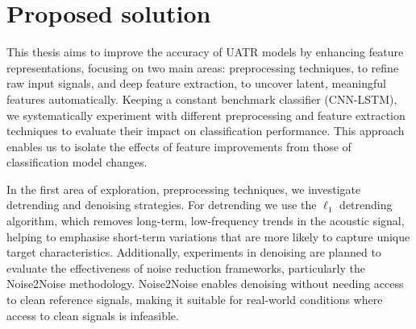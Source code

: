 
\section{Proposed solution}

This thesis aims to improve the accuracy of UATR models by enhancing feature representations, focusing on two main areas: preprocessing techniques, to refine raw input signals, and deep feature extraction, to uncover latent, meaningful features automatically. Keeping a constant benchmark classifier (CNN-LSTM), we systematically experiment with different preprocessing and feature extraction techniques to evaluate their impact on classification performance. This approach enables us to isolate the effects of feature improvements from those of classification model changes.

In the first area of exploration, preprocessing techniques, we investigate detrending and denoising strategies. For detrending we use the $\ell_1$ detrending algorithm, which removes long-term, low-frequency trends in the acoustic signal, helping to emphasise short-term variations that are more likely to capture unique target characteristics. Additionally, experiments in denoising are planned to evaluate the effectiveness of noise reduction frameworks, particularly the Noise2Noise methodology. Noise2Noise enables denoising without needing access to clean reference signals, making it suitable for real-world conditions where access to clean signals is infeasible. 

